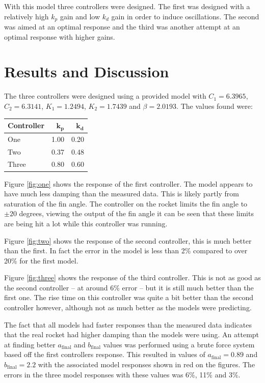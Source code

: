 \documentclass[a4paper,12pt]{article}
\begin{document}
    With this model three controllers were designed.  The first was designed
    with a relatively high $k_p$ gain and low $k_d$ gain in order to induce
    oscillations.  The second was aimed at an optimal response and the third was
    another attempt at an optimal response with higher gains.


  \section{Results and Discussion}

    The three controllers were designed using a provided model with $C_1 =
    6.3965$, $C_2 = 6.3141$, $K_1 = 1.2494$, $K_2 = 1.7439$ and $\beta =
    2.0193$.  The values found were:

    {
      \centering
      \begin{tabular}{l||r|r}
        \textbf{Controller} & $\boldsymbol{k_p}$ & $\boldsymbol{k_d}$ \\
        \hline
        One & 1.00 & 0.20 \\
        Two & 0.37 & 0.48 \\
        Three & 0.80 & 0.60 \\
      \end{tabular}
    }

    Figure \ref{fig:one} shows the response of the first controller.  The model
    appears to have much less damping than the measured data.  This is likely
    partly from saturation of the fin angle.  The controller on the rocket
    limits the fin angle to $\pm 20$ degrees, viewing the output of the fin
    angle it can be seen that these limits are being hit a lot while this
    controller was running.

    Figure \ref{fig:two} shows the response of the second controller, this is
    much better than the first.  In fact the error in the model is less than 2\%
    compared to over 20\% for the first model.

    Figure \ref{fig:three} shows the response of the third controller.  This
    is not as good as the second controller -- at around 6\% error -- but it is
    still much better than the first one.  The rise time on this controller was
    quite a bit better than the second controller however, although not as much
    better as the models were predicting.

    The fact that all models had faster responses than the measured data
    indicates that the real rocket had higher damping than the models were
    using.  An attempt at finding better $a_\text{final}$ and $b_\text{final}$
    values was performed using a brute force system based off the first
    controllers response.  This resulted in values of $a_\text{final} = 0.89$
    and $b_\text{final} = 2.2$ with the associated model responses shown in red
    on the figures.  The errors in the three model responses with these values
    was 6\%, 11\% and 3\%.
\end{document}
